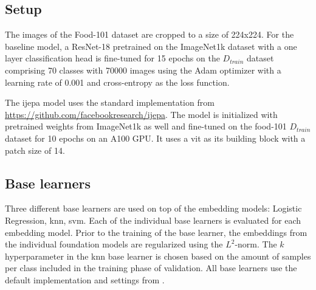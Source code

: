 \subsection{Setup}
The images of the Food-101 dataset are cropped to a size of 224x224.
For the baseline model, a ResNet-18 pretrained on the ImageNet1k dataset with a one layer classification head 
is fine-tuned for 15 epochs on the 
$D_{train}$ dataset comprising 70 classes with 70000 images using the Adam optimizer \cite{kingma_adam_2017} with a
learning rate of 0.001 and cross-entropy as the loss function.

The \gls{ijepa} model uses the standard implementation from \url{https://github.com/facebookresearch/ijepa}. The model 
is initialized with pretrained weights from ImageNet1k as well and fine-tuned on the food-101 $D_{train}$ dataset 
for 10 epochs on an A100 GPU. It uses a \gls{vit} as its building block with a patch size of 14.

\subsection{Base learners}
Three different base learners are used on top of the embedding models: Logistic Regression, \gls{knn}, \gls{svm}.
Each of the individual base learners is evaluated for each embedding model. Prior to the training of the base learner, the embeddings 
from the individual foundation models are regularized using the $L^2$-norm. The $k$ hyperparameter in the \gls{knn}	
base learner is chosen based on the amount of samples per class included in the training phase of validation. 
All base learners use the default implementation and settings from \cite{scikit-learn}.

